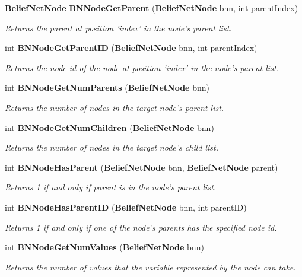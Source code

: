 \begin{CompactItemize}
{\bf Belief\-Net\-Node} {\bf BNNode\-Get\-Parent} ({\bf Belief\-Net\-Node} bnn, int parent\-Index)
\begin{CompactList}\small\item\em Returns the parent at position 'index' in the node's parent list. \item\end{CompactList}\item 
int {\bf BNNode\-Get\-Parent\-ID} ({\bf Belief\-Net\-Node} bnn, int parent\-Index)
\begin{CompactList}\small\item\em Returns the node id of the node at position 'index' in the node's parent list. \item\end{CompactList}\item 
int {\bf BNNode\-Get\-Num\-Parents} ({\bf Belief\-Net\-Node} bnn)
\begin{CompactList}\small\item\em Returns the number of nodes in the target node's parent list. \item\end{CompactList}\item 
int {\bf BNNode\-Get\-Num\-Children} ({\bf Belief\-Net\-Node} bnn)
\begin{CompactList}\small\item\em Returns the number of nodes in the target node's child list. \item\end{CompactList}\item 
int {\bf BNNode\-Has\-Parent} ({\bf Belief\-Net\-Node} bnn, {\bf Belief\-Net\-Node} parent)
\begin{CompactList}\small\item\em Returns 1 if and only if parent is in the node's parent list. \item\end{CompactList}\item 
int {\bf BNNode\-Has\-Parent\-ID} ({\bf Belief\-Net\-Node} bnn, int parent\-ID)
\begin{CompactList}\small\item\em Returns 1 if and only if one of the node's parents has the specified node id. \item\end{CompactList}\item 
int {\bf BNNode\-Get\-Num\-Values} ({\bf Belief\-Net\-Node} bnn)
\begin{CompactList}\small\item\em Returns the number of values that the variable represented by the node can take. \item\end{CompactList}\item 

\end{CompactItemize}
